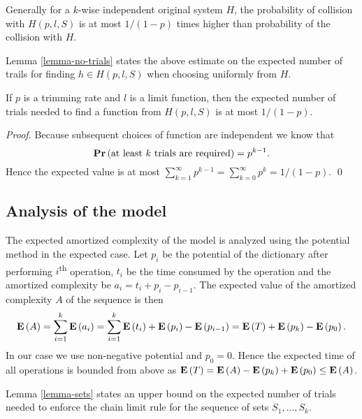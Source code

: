Generally for a $k$-wise independent original system $H$, the probability of collision with $H(p, l, S)$ is at most $1 / (1 - p)$ times higher than probability of the collision with $H$.

Lemma \ref{lemma-no-trials} states the above estimate on the expected number of trails for finding $h \in H(p, l, S)$ when choosing uniformly from $H$.

\begin{lemma}
\label{lemma-no-trials}
If $p$ is a trimming rate and $l$ is a limit function, then the expected number of trials needed to find a function from $H(p, l, S)$ is at most ${1}/{(1 - p)}$.
\end{lemma}
\begin{proof}
Because subsequent choices of function are independent we know that \[\mathbf{Pr}\left(\mbox{at least }k\mbox{ trials are required}\right) = p^{k - 1}.\]
Hence the expected value is at most $\sum_{k = 1}^{\infty} p^{k - 1} = \sum_{k = 0}^{\infty} p^k = {1}/{(1 - p)}.$
\qed
\end{proof}

\subsection{Analysis of the model}
The expected amortized complexity of the model is analyzed using the potential method in the expected case. Let $p_i$ be the potential of the dictionary after performing $i$\textsuperscript{th} operation, $t_i$ be the time consumed by the operation and the amortized complexity be $a_i = t_i + p_i - p_{i - 1}$. The expected value of the amortized complexity $A$ of the sequence is then
\[
\mathbf{E}\left(A\right) = \sum_{i=1}^{k} \mathbf{E}\left(a_i\right) = \sum_{i = 1}^{k} \mathbf{E}\left(t_i\right) + \mathbf{E}\left(p_i\right) - \mathbf{E}\left(p_{i - 1}\right) = \mathbf{E}\left(T\right) + \mathbf{E}\left(p_k\right) - \mathbf{E}\left(p_0\right).
\]
In our case we use non-negative potential and $p_0 = 0$. Hence the expected time of all operations is bounded from above as $\mathbf{E}\left(T\right) = \mathbf{E}\left(A\right) - \mathbf{E}\left(p_k\right) + \mathbf{E}\left(p_0\right) \leq \mathbf{E}\left(A\right)$.

Lemma \ref{lemma-sets} states an upper bound on the expected number of trials needed to enforce the chain limit rule for the sequence of sets $S_1, \dots, S_k$.

